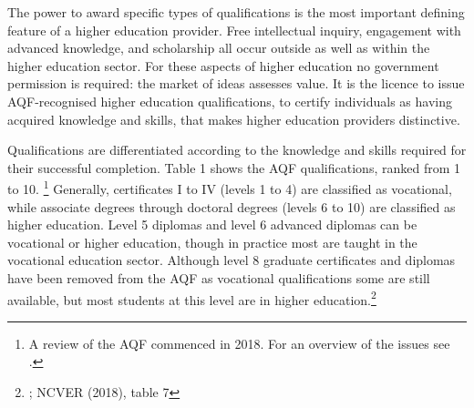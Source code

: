 \documentclass{grattan}
\begin{document}
The power to award specific types of qualifications is the most important defining feature of a higher education provider. Free intellectual inquiry, engagement with advanced knowledge, and scholarship all occur outside as well as within the higher education sector. For these aspects of higher education no government permission is required: the market of ideas assesses value. It is the licence to issue AQF-recognised higher education qualifications, to certify individuals as having acquired knowledge and skills, that makes higher education providers distinctive.

Qualifications are differentiated according to the knowledge and skills required for their successful completion. Table 1 shows the AQF qualifications, ranked from 1 to 10. \footnote{A review of the AQF commenced in 2018. For an overview of the issues see \textcite[][]{PhillipsKPA2018contextualresearch}.} Generally, certificates I to IV (levels 1 to 4) are classified as vocational, while associate degrees through doctoral degrees (levels 6 to 10) are classified as higher education. Level 5 diplomas and level 6 advanced diplomas can be vocational or higher education, though in practice most are taught in the vocational education sector. Although level 8 graduate certificates and diplomas have been removed from the AQF as vocational qualifications some are still available, but most students at this level are in higher education.\footnote{\textcite[][table~2.3]{DepartmentofEducationandTraining2017totalresourcingfo}; NCVER (2018), table 7}

\begin{table} \caption{Australian Qualifications Framework}


\end{table}
\end{document}
